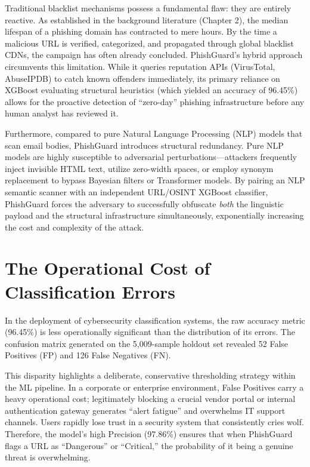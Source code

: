 Traditional blacklist mechanisms possess a fundamental flaw: they are
entirely reactive. As established in the background literature (Chapter
2), the median lifespan of a phishing domain has contracted to mere
hours. By the time a malicious URL is verified, categorized, and
propagated through global blacklist CDNs, the campaign has often already
concluded. PhishGuard's hybrid approach circumvents this limitation.
While it queries reputation APIs (VirusTotal, AbuseIPDB) to catch known
offenders immediately, its primary reliance on XGBoost evaluating
structural heuristics (which yielded an accuracy of 96.45\%) allows for
the proactive detection of ``zero-day'' phishing infrastructure before
any human analyst has reviewed it.

Furthermore, compared to pure Natural Language Processing (NLP) models
that scan email bodies, PhishGuard introduces structural redundancy.
Pure NLP models are highly susceptible to adversarial
perturbations---attackers frequently inject invisible HTML text, utilize
zero-width spaces, or employ synonym replacement to bypass Bayesian
filters or Transformer models. By pairing an NLP semantic scanner with
an independent URL/OSINT XGBoost classifier, PhishGuard forces the
adversary to successfully obfuscate \emph{both} the linguistic payload
and the structural infrastructure simultaneously, exponentially
increasing the cost and complexity of the attack.

\section{The Operational Cost of Classification
Errors}\label{the-operational-cost-of-classification-errors}

In the deployment of cybersecurity classification systems, the raw
accuracy metric (96.45\%) is less operationally significant than the
distribution of its errors. The confusion matrix generated on the
5,009-sample holdout set revealed 52 False Positives (FP) and 126 False
Negatives (FN).

This disparity highlights a deliberate, conservative thresholding
strategy within the ML pipeline. In a corporate or enterprise
environment, False Positives carry a heavy operational cost;
legitimately blocking a crucial vendor portal or internal authentication
gateway generates ``alert fatigue'' and overwhelms IT support channels.
Users rapidly lose trust in a security system that consistently cries
wolf. Therefore, the model's high Precision (97.86\%) ensures that when
PhishGuard flags a URL as ``Dangerous'' or ``Critical,'' the probability
of it being a genuine threat is overwhelming.

